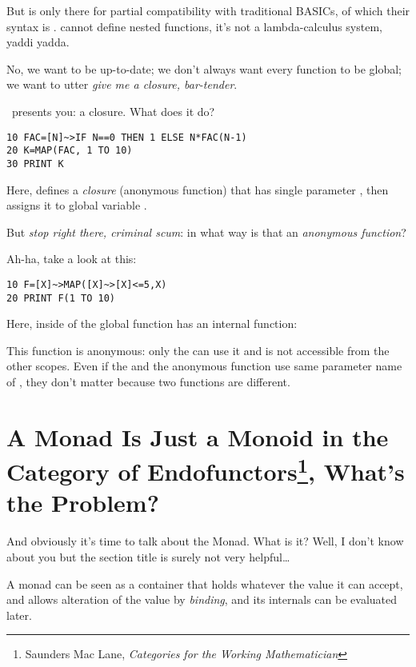 But  is only there for partial compatibility with traditional BASICs, of which their syntax is .  cannot define nested functions, it's not a lambda-calculus system, yaddi yadda.

No, we want to be up-to-date; we don't always want every function to be global; we want to utter \emph{give me a closure, bar-tender}.

\tbas\ presents you: a closure. What does it do?

\begin{lstlisting}
10 FAC=[N]~>IF N==0 THEN 1 ELSE N*FAC(N-1)
20 K=MAP(FAC, 1 TO 10)
30 PRINT K
\end{lstlisting}

Here, \code{[N]\basicclosure\,\ldots} defines a \emph{closure} (anonymous function) that has single parameter , then assigns it to global variable .

But \emph{stop right there, criminal scum}: in what way is that an \emph{anonymous function}?

Ah-ha, take a look at this:

\begin{lstlisting}
10 F=[X]~>MAP([X]~>[X]<=5,X)
20 PRINT F(1 TO 10)
\end{lstlisting}

Here,  inside of the global function  has an internal function: 

This function is anonymous: only the  can use it and is not accessible from the other scopes. Even if the  and the anonymous function use same parameter name of , they don't matter because two functions are different.

\section[Monad]{A Monad Is Just a Monoid in the Category of Endofunctors\footnote{Saunders Mac Lane, \emph{Categories for the Working Mathematician}}, What's the Problem?}

And obviously it's time to talk about the Monad. What is it? Well, I don't know about you but the section title is surely not very helpful\ldots

A monad can be seen as a container that holds whatever the value it can accept, and allows alteration of the value by \emph{binding}, and its internals can be evaluated later.

